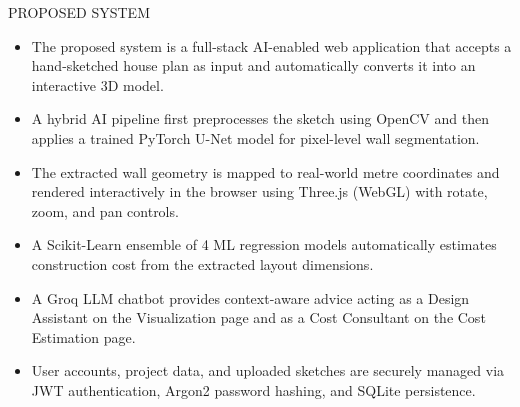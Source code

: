 \documentclass[aspectratio=169]{beamer}
\begin{document}
\begin{frame}{PROPOSED SYSTEM}
\begin{itemize}
  \item The proposed system is a full-stack AI-enabled web application that accepts a hand-sketched house plan as input and automatically converts it into an interactive 3D model.
  \item A hybrid AI pipeline first preprocesses the sketch using OpenCV and then applies a trained PyTorch U-Net model for pixel-level wall segmentation.
  \item The extracted wall geometry is mapped to real-world metre coordinates and rendered interactively in the browser using Three.js (WebGL) with rotate, zoom, and pan controls.
  \item A Scikit-Learn ensemble of 4 ML regression models automatically estimates construction cost from the extracted layout dimensions.
  \item A Groq LLM chatbot provides context-aware advice \—acting as a Design Assistant on the Visualization page and as a Cost Consultant on the Cost Estimation page.
  \item User accounts, project data, and uploaded sketches are securely managed via JWT authentication, Argon2 password hashing, and SQLite persistence.
\end{itemize}
\end{frame}
\end{document}
